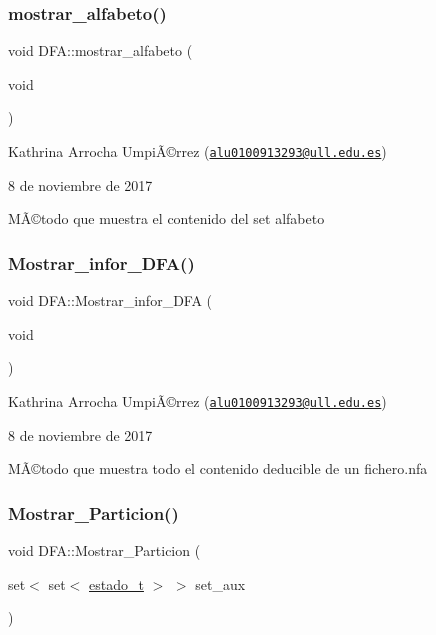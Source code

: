 \subsubsection{\texorpdfstring{mostrar\+\_\+alfabeto()}{mostrar\_alfabeto()}}
{\footnotesize\ttfamily void D\+F\+A\+::mostrar\+\_\+alfabeto (\begin{DoxyParamCaption}\item[{void}]{ }\end{DoxyParamCaption})}

Kathrina Arrocha UmpiÃ©rrez (\href{mailto:alu0100913293@ull.edu.es}{\tt alu0100913293@ull.\+edu.\+es})

8 de noviembre de 2017

MÃ©todo que muestra el contenido del set alfabeto \mbox{\label{class_d_f_a_aa5259d18788a67e78b21be91dbadc88f}} 
\subsubsection{\texorpdfstring{Mostrar\+\_\+infor\+\_\+\+D\+F\+A()}{Mostrar\_infor\_DFA()}}
{\footnotesize\ttfamily void D\+F\+A\+::\+Mostrar\+\_\+infor\+\_\+\+D\+FA (\begin{DoxyParamCaption}\item[{void}]{ }\end{DoxyParamCaption})}

Kathrina Arrocha UmpiÃ©rrez (\href{mailto:alu0100913293@ull.edu.es}{\tt alu0100913293@ull.\+edu.\+es})

8 de noviembre de 2017

MÃ©todo que muestra todo el contenido deducible de un fichero.\+nfa \mbox{\label{class_d_f_a_acbe2cc4d41a1e30a8c185b262189ac71}} 
\subsubsection{\texorpdfstring{Mostrar\+\_\+\+Particion()}{Mostrar\_Particion()}}
{\footnotesize\ttfamily void D\+F\+A\+::\+Mostrar\+\_\+\+Particion (\begin{DoxyParamCaption}\item[{set$<$ set$<$ \hyperlink{classestado__t}{estado\+\_\+t} $>$ $>$}]{set\+\_\+aux }\end{DoxyParamCaption})}

